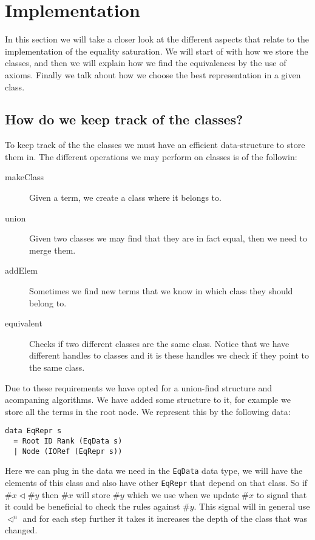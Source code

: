 
\section{Implementation}
In this section we will take a closer look at the different aspects that relate
to the implementation of the equality saturation. We will start of with how
we store the classes, and then we will explain how we find the equivalences by 
the use of axioms. Finally we talk about how we choose the best representation in
a given class.
\subsection{How do we keep track of the classes?}
To keep track of the the classes we must have an efficient data-structure to store
them in. The different operations we may perform on classes is of the followin:

\begin{description}
  \item[makeClass] Given a term, we create a class where it belongs to.
  \item[union]     Given two classes we may find that they are in fact equal, then
                   we need to merge them.
  \item[addElem]   Sometimes we find new terms that we know in which class they
                   should belong to.
  \item[equivalent] Checks if two different classes are the same class. Notice
                    that we have different handles to classes and it is these
                    handles we check if they point to the same class.
\end{description}

Due to these requirements we have opted for a union-find structure and acompaning
algorithms. We have added some structure to it, for example we store all the terms
in the root node. We represent this by the following data:

\begin{verbatim}
data EqRepr s
  = Root ID Rank (EqData s)
  | Node (IORef (EqRepr s))
\end{verbatim}

Here we can plug in the data we need in the \verb|EqData| data type, we will have
the elements of this class and also have other \verb|EqRepr| that depend on that
class. So if $\#x \lhd \#y$ then $\#x$ will store $\#y$ which we use when we update
$\#x$ to signal that it could be beneficial to check the rules against $\#y$. This
signal will in general use $\lhd^n$ and for each step further it takes it increases
the depth of the class that was changed.


